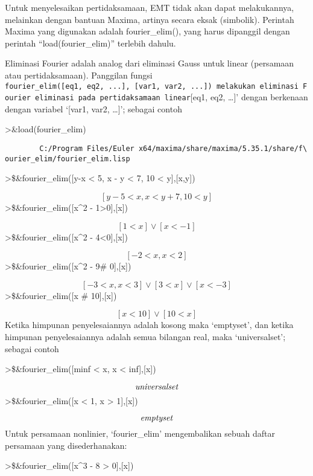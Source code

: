 \documentclass[
]{book}
\begin{document}
Untuk menyelesaikan pertidaksamaan, EMT tidak akan dapat melakukannya, melainkan dengan bantuan Maxima, artinya secara eksak (simbolik). Perintah Maxima yang digunakan adalah fourier\_elim(), yang harus dipanggil dengan perintah ``load(fourier\_elim)'' terlebih dahulu.

Eliminasi Fourier adalah analog dari eliminasi Gauss untuk linear (persamaan atau pertidaksamaan). Panggilan fungsi \texttt{fourier\_elim({[}eq1,\ eq2,\ ...{]},\ {[}var1,\ var2,\ ...{]})\textquotesingle{}\ melakukan\ eliminasi\ Fourier\ eliminasi\ pada\ pertidaksamaan\ linear}{[}eq1, eq2, \ldots{]}' dengan berkenaan dengan variabel `{[}var1, var2, \ldots{]}'; sebagai contoh

\textgreater\&load(fourier\_elim)

\begin{verbatim}
        C:/Program Files/Euler x64/maxima/share/maxima/5.35.1/share/f\
ourier_elim/fourier_elim.lisp
\end{verbatim}

\textgreater\$\&fourier\_elim({[}y-x \textless{} 5, x - y \textless{} 7, 10 \textless{} y{]},{[}x,y{]})

\[\left[ y-5<x , x<y+7 , 10<y \right] \]\textgreater\$\&fourier\_elim({[}x\^{}2 - 1\textgreater0{]},{[}x{]})

\[\left[ 1<x \right] \lor \left[ x<-1 \right] \]\textgreater\$\&fourier\_elim({[}x\^{}2 - 4\textless0{]},{[}x{]})

\[\left[ -2<x , x<2 \right] \]\textgreater\$\&fourier\_elim({[}x\^{}2 - 9\# 0{]},{[}x{]})

\[\left[ -3<x , x<3 \right] \lor \left[ 3<x \right] \lor \left[ x<-3
  \right] \]\textgreater\$\&fourier\_elim({[}x \# 10{]},{[}x{]})

\[\left[ x<10 \right] \lor \left[ 10<x \right] \]Ketika himpunan penyelesaiannya adalah kosong maka `emptyset', dan ketika himpunan penyelesaiannya adalah semua bilangan real, maka `universalset'; sebagai contoh

\textgreater\$\&fourier\_elim({[}minf \textless{} x, x \textless{} inf{]},{[}x{]})

\[{\it universalset}\]\textgreater\$\&fourier\_elim({[}x \textless{} 1, x \textgreater{} 1{]},{[}x{]})

\[{\it emptyset}\]Untuk persamaan nonlinier, `fourier\_elim' mengembalikan sebuah daftar persamaan yang disederhanakan:

\textgreater\$\&fourier\_elim({[}x\^{}3 - 8 \textgreater{} 0{]},{[}x{]})
\end{document}
